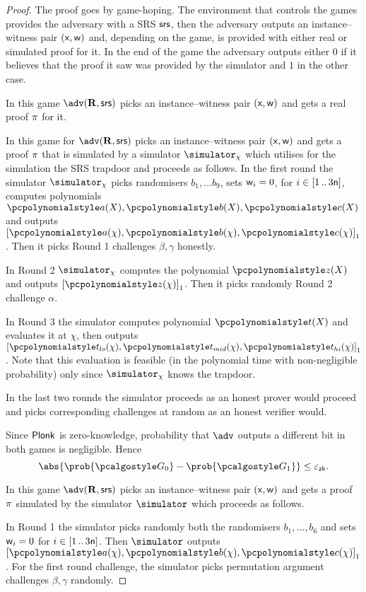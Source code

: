 \documentclass[runningheads,11pt]{llncs}
\theoremstyle{definition} \newtheorem{definition}[theorem]{Definition}
\begin{document}
\begin{proof}
  The proof goes by game-hoping. The environment that controls the games
  provides the adversary with a SRS $\mathsf{srs}$, then the adversary outputs an
  instance--witness pair $(\mathsf{x}, \mathsf{w})$ and, depending on the game, is provided
  with either real or simulated proof for it. In the end of the game the
  adversary outputs either $0$ if it believes that the proof it saw was provided
  by the simulator and $1$ in the other case.

   In this game $\adv(\REL, \srs)$ picks an instance--witness pair
  $(\mathsf{x}, \mathsf{w})$ and gets a real proof $\pi$ for it.

   In this game for $\adv(\REL, \srs)$ picks an instance--witness pair
  $(\mathsf{x}, \mathsf{w})$ and gets a proof $\pi$ that is simulated by a simulator
  $\simulator_\chi$ which utilises for the simulation the SRS trapdoor and
  proceeds as follows. In the first round the simulator $\simulator_\chi$ picks
  randomisers $b_1, \ldots b_9$, sets $\mathsf{w}_i = 0$, for $i \in [1 \, .. \, 3
    \mathsf{n}]$, computes polynomials $\pa(X), \pb(X), \pc(X)$ and
  outputs $\gone{\pa(\chi), \pb(\chi), \pc(\chi)}$. Then it picks Round 1
  challenges $\beta, \gamma$ honestly.

  In Round 2 $\simulator_\chi$ computes the polynomial $\pz(X)$ and
  outputs $\gone{\pz(\chi)}$. Then it picks randomly Round 2 challenge $\alpha$.

  In Round 3 the simulator computes polynomial $\pt(X)$ and evaluates it
  at $\chi$, then outputs $\gone{\ptlo(\chi), \ptmid(\chi), \pthi(\chi)}$. Note
  that this evaluation is feasible (in the polynomial time with non-negligible
  probability) only since $\simulator_\chi$ knows the trapdoor.

  In the last two rounds the simulator proceeds as an honest prover would
  proceed and picks corresponding challenges at random as an honest verifier
  would.

   Since $\textnormal{\textsf{Plonk}}$ is zero-knowledge,
  probability that $\adv$ outputs a different bit in both games is negligible.
  Hence
  \[
	\abs{\prob{\game{0}} - \prob{\game{1}}} \leq \epszk.
\]

 In this game $\adv(\REL, \srs)$ picks an instance--witness pair
$(\mathsf{x}, \mathsf{w})$ and gets a proof $\pi$ simulated by the simulator
$\simulator$ which proceeds as follows.

In Round 1 the simulator  picks randomly both the randomisers $b_1, \ldots, b_6$ and
sets $\mathsf{w}_i = 0$ for $i \in [1 \, .. \, 3\mathsf{n}]$. Then $\simulator$
outputs $\gone{\p{a}(\chi), \p{b}(\chi), \p{c}(\chi)}$. For the first round
challenge, the simulator picks permutation argument challenges $\beta, \gamma$
randomly.


\end{proof}
\end{document}
